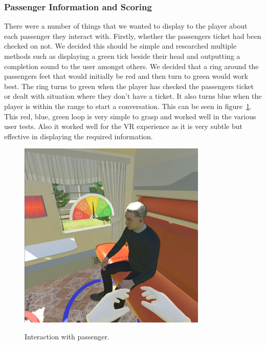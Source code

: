 \subsubsection{Passenger Information and Scoring}
There were a number of things that we wanted to display to the player about each passenger they interact with. Firstly, whether the passengers ticket had been checked on not. We decided this should be simple and researched multiple methods such as displaying a green tick beside their head and outputting a completion sound to the user amongst others. We decided that a ring around the passengers feet that would initially be red and then turn to green would work best. The ring turns to green when the player has checked the passengers ticket or dealt with situation where they don't have a ticket. It also turns blue when the player is within the range to start a conversation. This can be seen in figure~\ref{fig:interaction1}. This red, blue, green loop is very simple to grasp and worked well in the various user tests. Also it worked well for the VR experience as it is very subtle but effective in displaying the required information.

\begin{figure}[!ht]
    \centering
    \caption{Interaction with passenger.}
    \includegraphics[width=0.8\textwidth]{Images/Interaction.jpg}
    \label{fig:interaction1}
\end{figure}

\newpage

